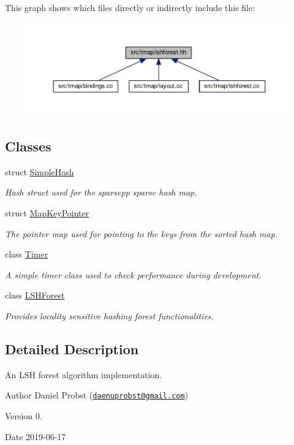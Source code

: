 This graph shows which files directly or indirectly include this file\+:\nopagebreak
\begin{figure}[H]
\begin{center}
\leavevmode
\includegraphics[width=350pt]{lshforest_8hh__dep__incl}
\end{center}
\end{figure}
\subsection*{Classes}
\begin{DoxyCompactItemize}
\item 
struct \hyperlink{structSimpleHash}{Simple\+Hash}
\begin{DoxyCompactList}\small\item\em Hash struct used for the sparsepp sparse hash map. \end{DoxyCompactList}\item 
struct \hyperlink{structMapKeyPointer}{Map\+Key\+Pointer}
\begin{DoxyCompactList}\small\item\em The pointer map used for pointing to the keys from the sorted hash map. \end{DoxyCompactList}\item 
class \hyperlink{classTimer}{Timer}
\begin{DoxyCompactList}\small\item\em A simple timer class used to check performance during development. \end{DoxyCompactList}\item 
class \hyperlink{classLSHForest}{L\+S\+H\+Forest}
\begin{DoxyCompactList}\small\item\em Provides locality sensitive hashing forest functionalities. \end{DoxyCompactList}\end{DoxyCompactItemize}


\subsection{Detailed Description}
An L\+SH forest algorithm implementation. 

\begin{DoxyAuthor}{Author}
Daniel Probst (\href{mailto:daenuprobst@gmail.com}{\tt daenuprobst@gmail.\+com}) 
\end{DoxyAuthor}
\begin{DoxyVersion}{Version}
0. 
\end{DoxyVersion}
\begin{DoxyDate}{Date}
2019-\/06-\/17 
\end{DoxyDate}
